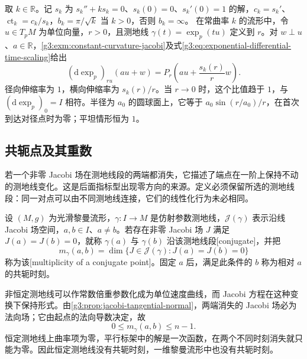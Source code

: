 \begin{example}\label{g3:exm:model-exponential-differential}
	取 \(k\in\mathbb R\)。记 \(s_k\) 为 \(s_k''+ks_k=0\)、\(s_k(0)=0\)、\(s_k'(0)=1\) 的解，\(c_k=s_k'\)、\(\operatorname{ct}_k=c_k/s_k\)，\(b_k=\pi/\sqrt k\) 当 \(k>0\)，否则 \(b_k=\infty\)。
	在常曲率 \(k\) 的流形中，令 \(u\in T_pM\) 为单位向量，\(r>0\)，且测地线 \(\gamma(t)=\exp_p(tu)\) 定义到 \(r\)。对 \(w\perp u\)、\(a\in\mathbb R\)，\cref{g3:exm:constant-curvature-jacobi}及式\eqref{g3:eq:exponential-differential-time-scaling}给出
	\begin{equation}\label{g3:eq:model-exponential-differential}
		(\mathrm d\exp_p)_{ru}(au+w)
		=P_r\left(au+\frac{s_k(r)}r w\right).
	\end{equation}
	径向伸缩率为 \(1\)，横向伸缩率为 \(s_k(r)/r\)。当 \(r\to0\) 时，这个比值趋于 \(1\)，与 \((\mathrm d\exp_p)_0=I\) 相符。半径为 \(a_0\) 的圆球面上，它等于 \(a_0\sin(r/a_0)/r\)，在首次到达对径点时为零；平坦情形恒为 \(1\)。
\end{example}

\subsection{共轭点及其重数}
\label{g3:subsec:0602:04}

若一个非零 Jacobi 场在测地线段的两端都消失，它描述了端点在一阶上保持不动的测地线变化。这是后面指标型出现零方向的来源。定义必须保留所选的测地线段：同一对点可以由不同测地线连接，它们的线性化行为未必相同。

\begin{definition}[共轭点与重数]\label{g3:def:conjugate-point}
	设 \((M,g)\) 为光滑黎曼流形，\(\gamma:I\to M\) 是仿射参数测地线，\(\mathcal J(\gamma)\) 表示沿线 Jacobi 场空间，\(a,b\in I\)、\(a\ne b\)。若存在非零 Jacobi 场 \(J\) 满足 \(J(a)=J(b)=0\)，就称 \(\gamma(a)\) 与 \(\gamma(b)\) 沿该测地线段[conjugate]，并把
	\begin{equation}\label{g3:eq:conjugate-multiplicity}
		m_\gamma(a,b)
		=\dim\{J\in\mathcal J(\gamma):J(a)=J(b)=0\}
	\end{equation}
	称为该[multiplicity of a conjugate point]。固定 \(a\) 后，满足此条件的 \(b\) 称为相对 \(a\) 的共轭时刻。
\end{definition}

非恒定测地线可以作常数倍重参数化成为单位速度曲线，而 Jacobi 方程在这种变换下保持形式。由\cref{g3:prop:jacobi-tangential-normal}，两端消失的 Jacobi 场必为法向场；它由起点的法向导数决定，故
\[
	0\le m_\gamma(a,b)\le n-1.
\]
恒定测地线上曲率项为零，平行标架中的解是一次函数，在两个不同时刻消失就只能为零。因此恒定测地线没有共轭时刻，一维黎曼流形中也没有共轭时刻。

